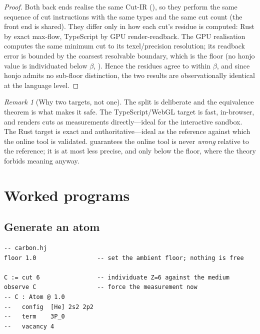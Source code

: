 \documentclass[11pt,a4paper]{article}
\theoremstyle{thmstyle}
\theoremstyle{definition}
\theoremstyle{remark}
\newtheorem{remark}[theorem]{Remark}
\newcommand{\flo}{\beta}
\begin{document}
\begin{proof}
Both back ends realise the same Cut-IR (), so they perform
the same sequence of cut instructions with the same types and the same
cut count (the front end is shared). They differ only in how each cut's
residue is computed: Rust by exact max-flow, TypeScript by GPU
render-readback. The GPU realisation computes the same minimum cut to its
texel/precision resolution; its readback error is bounded by the
coarsest resolvable boundary, which is the floor (no honjo value is
individuated below $\flo$, ). Hence the residues
agree to within $\flo$, and since honjo admits no sub-floor distinction,
the two results are observationally identical at the language level.
\end{proof}

\begin{remark}[Why two targets, not one]
\label{rem:two-targets}
The split is deliberate and the equivalence theorem is what makes it
safe. The TypeScript/WebGL target is fast, in-browser, and renders cuts as
measurements directly---ideal for the interactive sandbox. The Rust target
is exact and authoritative---ideal as the reference against which the
online tool is validated.  guarantees the online
tool is never \emph{wrong} relative to the reference; it is at most less
precise, and only below the floor, where the theory forbids meaning
anyway.
\end{remark}

\section{Worked programs}
\label{sec:examples}

\subsection{Generate an atom}

\begin{lstlisting}[caption={Individuating carbon (a length-one cut).}]
-- carbon.hj
floor 1.0                 -- set the ambient floor; nothing is free

C := cut 6                -- individuate Z=6 against the medium
observe C                 -- force the measurement now
-- C : Atom @ 1.0
--   config  [He] 2s2 2p2
--   term    3P_0
--   vacancy 4
\end{lstlisting}
\end{document}

